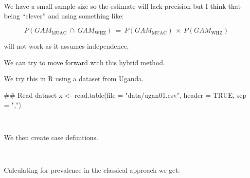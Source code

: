 \documentclass[12pt,a4paper]{article}
\newenvironment{Shaded}{}{}
\newcommand{\CommentTok}[1]{\textcolor[rgb]{0.00,0.50,0.00}{#1}}
\newcommand{\DataTypeTok}[1]{#1}
\newcommand{\DecValTok}[1]{#1}
\newcommand{\KeywordTok}[1]{\textcolor[rgb]{0.00,0.00,1.00}{#1}}
\newcommand{\NormalTok}[1]{#1}
\newcommand{\OperatorTok}[1]{#1}
\newcommand{\OtherTok}[1]{\textcolor[rgb]{1.00,0.25,0.00}{#1}}
\newcommand{\StringTok}[1]{\textcolor[rgb]{0.00,0.50,0.50}{#1}}
\begin{document}
We have a small sample size so the estimate will lack precision but I think that being ``clever'' and using something like:

\[ P(GAM_{\text{MUAC}} ~ \cap ~ GAM_{\text{WHZ}}) ~ = ~ P(GAM_{\text{MUAC}}) ~ \times ~ P(GAM_{\text{WHZ}}) \]

will not work as it assumes independence.

We can try to move forward with this hybrid method.

\newpage

We try this in R using a dataset from Uganda.

\begin{Shaded}
\begin{Highlighting}[]
\CommentTok{## Read dataset}
\NormalTok{x <-}\StringTok{ }\KeywordTok{read.table}\NormalTok{(}\DataTypeTok{file =} \StringTok{"data/ugan01.csv"}\NormalTok{, }\DataTypeTok{header =} \OtherTok{TRUE}\NormalTok{, }\DataTypeTok{sep =} \StringTok{","}\NormalTok{)}
\end{Highlighting}
\end{Shaded}

~

We then create case definitions.

\begin{Shaded}
\end{Shaded}

~

Calculating for prevalence in the classical approach we get:
\end{document}
